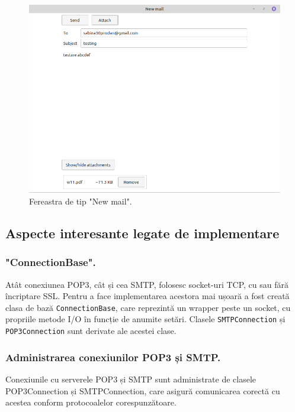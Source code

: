 \documentclass[runningheads]{llncs}
\begin{document}
\begin{figure}
    \centering
    \includegraphics[width=\textwidth]{newMail.png}
    \caption{Fereastra de tip "New mail".}
    \label{fig:newmail}
\end{figure}

\newpage

\subsection{Aspecte interesante legate de implementare}

\subsubsection*{"ConnectionBase".} Atât conexiunea POP3, cât și cea SMTP, folosesc socket-uri TCP, cu sau fără încriptare SSL. Pentru a face implementarea acestora mai ușoară a fost creată clasa de bază \texttt{ConnectionBase}, care reprezintă un wrapper peste un socket, cu propriile metode I/O în funcție de anumite setări. Clasele \texttt{SMTPConnection} și \texttt{POP3Connection} sunt derivate ale acestei clase.

\subsubsection{Administrarea conexiunilor POP3 și SMTP.}

Conexiunile cu serverele POP3 și SMTP sunt administrate de clasele POP3Connection și SMTPConnection, care asigură comunicarea corectă cu acestea conform protocoalelor corespunzătoare. 
\end{document}
